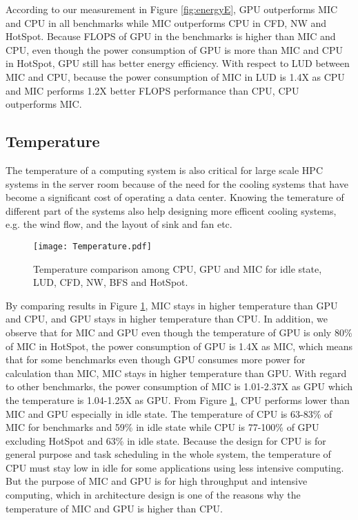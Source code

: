 According to our measurement in Figure \ref{fig:energyE}, GPU outperforms MIC and CPU in all benchmarks while MIC outperforms CPU in CFD, NW and HotSpot. Because FLOPS of GPU in the benchmarks is higher than MIC and CPU, even though the power consumption of GPU is more than MIC and CPU in HotSpot, GPU still has better energy efficiency. With respect to LUD between MIC and CPU, because the power consumption of MIC in LUD is 1.4X as CPU and MIC performs 1.2X better FLOPS performance than CPU, CPU outperforms MIC.


\subsection{Temperature}

The temperature of a computing system is also critical for large scale HPC systems in the server room 
because of the need for the cooling systems that have become a significant cost of operating a data center. Knowing the
temerature of different part of the systems also help designing more efficent cooling systems, e.g. 
the wind flow, and the layout of sink and fan etc. 

    \begin{figure}[h!]
  \centering
  \begin{minipage}{0.5\textwidth}
    \centering
   \centering
     \texttt{[image: Temperature.pdf]}    
\caption{Temperature comparison among CPU, GPU and MIC for idle state, LUD, CFD, NW, BFS and HotSpot.}
\label{fig:temperature}
\end{minipage}%
\end{figure}

By comparing results in Figure \ref{fig:temperature}, MIC stays in higher temperature than GPU and CPU, and GPU stays in higher temperature than CPU. In addition, we observe that for MIC and GPU even though the temperature of GPU is only 80\% of MIC in HotSpot, the power consumption of GPU is 1.4X as MIC, which means that for some benchmarks even though GPU consumes more power for calculation than MIC, MIC stays in higher temperature than GPU. With regard to other benchmarks, the power consumption of MIC is 1.01-2.37X as GPU which the temperature is 1.04-1.25X as GPU. From Figure \ref{fig:temperature}, CPU performs lower than MIC and GPU especially in idle state. The temperature of CPU is 63-83\% of MIC for benchmarks and 59\% in idle state while CPU is 77-100\% of GPU excluding HotSpot and 63\% in idle state. Because the design for CPU is for general purpose and task scheduling in the whole system, the temperature of CPU must stay low in idle for some applications using less intensive computing. But the purpose of MIC and GPU is for high throughput and intensive computing, which in architecture design is one of the reasons why the temperature of MIC and GPU is higher than CPU.



